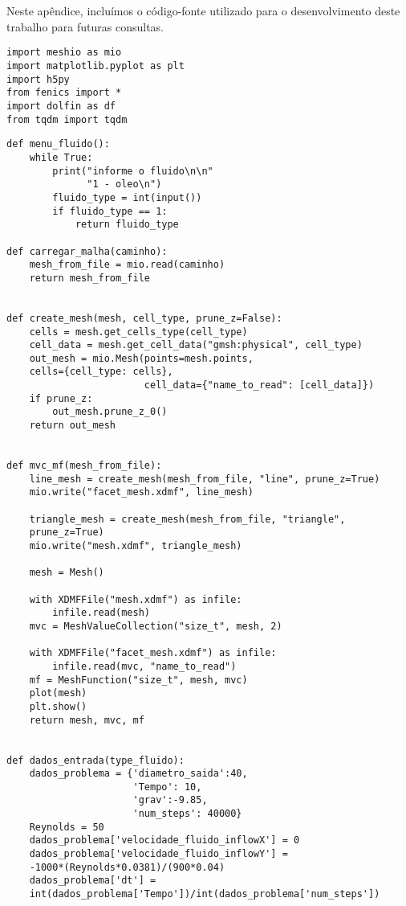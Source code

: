 \pagebreak
\section*{}
\label{app}

Neste apêndice, incluímos o código-fonte utilizado para o desenvolvimento deste trabalho para futuras consultas.

\begin{lstlisting}[title=\phantom{}]
import meshio as mio
import matplotlib.pyplot as plt
import h5py
from fenics import *
import dolfin as df
from tqdm import tqdm
\end{lstlisting}

\begin{lstlisting}[title=\phantom{}]
def menu_fluido():
    while True:
        print("informe o fluido\n\n"
              "1 - oleo\n")
        fluido_type = int(input())
        if fluido_type == 1:
            return fluido_type

def carregar_malha(caminho):
    mesh_from_file = mio.read(caminho)
    return mesh_from_file


def create_mesh(mesh, cell_type, prune_z=False):
    cells = mesh.get_cells_type(cell_type)
    cell_data = mesh.get_cell_data("gmsh:physical", cell_type)
    out_mesh = mio.Mesh(points=mesh.points, 
    cells={cell_type: cells}, 
                        cell_data={"name_to_read": [cell_data]})
    if prune_z:
        out_mesh.prune_z_0()
    return out_mesh


def mvc_mf(mesh_from_file):
    line_mesh = create_mesh(mesh_from_file, "line", prune_z=True)
    mio.write("facet_mesh.xdmf", line_mesh)

    triangle_mesh = create_mesh(mesh_from_file, "triangle",
    prune_z=True)
    mio.write("mesh.xdmf", triangle_mesh)

    mesh = Mesh()
    
    with XDMFFile("mesh.xdmf") as infile:
        infile.read(mesh)
    mvc = MeshValueCollection("size_t", mesh, 2)

    with XDMFFile("facet_mesh.xdmf") as infile:
        infile.read(mvc, "name_to_read")
    mf = MeshFunction("size_t", mesh, mvc)
    plot(mesh)
    plt.show()
    return mesh, mvc, mf


def dados_entrada(type_fluido):
    dados_problema = {'diametro_saida':40,
                      'Tempo': 10,
                      'grav':-9.85,
                      'num_steps': 40000}
    Reynolds = 50
    dados_problema['velocidade_fluido_inflowX'] = 0
    dados_problema['velocidade_fluido_inflowY'] =
    -1000*(Reynolds*0.0381)/(900*0.04)
    dados_problema['dt'] =
    int(dados_problema['Tempo'])/int(dados_problema['num_steps'])
    

\end{lstlisting}

